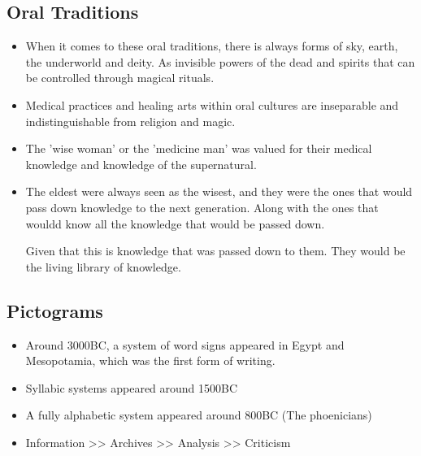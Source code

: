 \documentclass{article}
\begin{document}
\subsection{Oral Traditions}
\begin{itemize}
  \item When it comes to these oral traditions, there
    is always forms of sky, earth, the underworld and deity.
    As invisible powers of the dead and spirits that can be controlled
    through magical rituals.
  \item Medical practices and healing arts within oral cultures are
    inseparable and indistinguishable from religion and magic.
  \item The 'wise woman' or the 'medicine man' was valued
    for their medical knowledge and knowledge of the supernatural.
  \item The eldest were always seen as the wisest, and they were the ones
    that would pass down knowledge to the next generation. Along with
    the ones that wouldd know all the knowledge that would be passed down.

    Given that this is knowledge that was passed down to them.
    They would be the living library of knowledge.
\end{itemize}

\subsection{Pictograms}
\begin{itemize}
  \item Around 3000BC, a system of word signs appeared in Egypt
    and Mesopotamia, which was the first form of writing.
  \item Syllabic systems appeared around 1500BC
  \item A fully alphabetic system appeared around 800BC (The phoenicians)
  \item Information >> Archives >> Analysis >> Criticism
\end{itemize}
\end{document}
